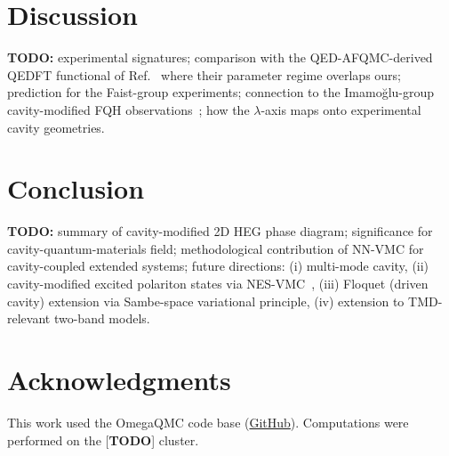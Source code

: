 \documentclass[aps,prl,reprint,superscriptaddress,longbibliography]{revtex4-2}
\begin{document}
\section{Discussion}\label{sec:discussion}

\textbf{TODO:} experimental signatures; comparison with the
QED-AFQMC-derived QEDFT functional of Ref.~\cite{Weber2025} where their
parameter regime overlaps ours; prediction for the Faist-group
experiments; connection to the Imamo\u{g}lu-group cavity-modified FQH
observations~\cite{Smolka2014,Enkner2024}; how the
$\lambda$-axis maps onto experimental cavity geometries.

\section{Conclusion}\label{sec:conclusion}

\textbf{TODO:} summary of cavity-modified 2D HEG phase diagram;
significance for cavity-quantum-materials field; methodological
contribution of NN-VMC for cavity-coupled extended systems; future
directions: (i) multi-mode cavity, (ii) cavity-modified excited
polariton states via NES-VMC~\cite{Pfau2024}, (iii) Floquet (driven
cavity) extension via Sambe-space variational principle, (iv) extension
to TMD-relevant two-band models.

\section*{Acknowledgments}

This work used the OmegaQMC code base (\href{https://github.com/...}{GitHub}).
Computations were performed on the [\textbf{TODO}] cluster.


\end{document}
